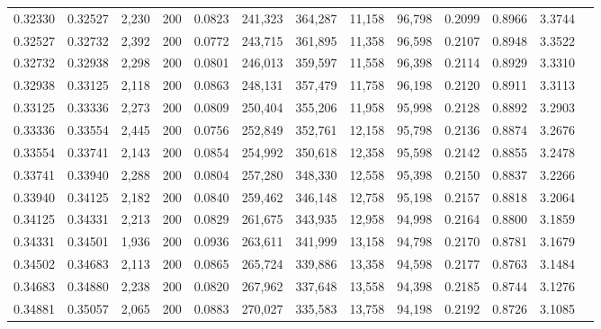 \begin{tabular}{rrrrrrrrrrrrr}
0.32330 & 0.32527 &  2,230 & 200 &                                     0.0823 & 241,323 & 364,287 &  11,158 &  96,798 & 0.2099 & 0.8966 & 3.3744 \\
0.32527 & 0.32732 &  2,392 & 200 &                                     0.0772 & 243,715 & 361,895 &  11,358 &  96,598 & 0.2107 & 0.8948 & 3.3522 \\
0.32732 & 0.32938 &  2,298 & 200 &                                     0.0801 & 246,013 & 359,597 &  11,558 &  96,398 & 0.2114 & 0.8929 & 3.3310 \\
0.32938 & 0.33125 &  2,118 & 200 &                                     0.0863 & 248,131 & 357,479 &  11,758 &  96,198 & 0.2120 & 0.8911 & 3.3113 \\
0.33125 & 0.33336 &  2,273 & 200 &                                     0.0809 & 250,404 & 355,206 &  11,958 &  95,998 & 0.2128 & 0.8892 & 3.2903 \\
0.33336 & 0.33554 &  2,445 & 200 &                                     0.0756 & 252,849 & 352,761 &  12,158 &  95,798 & 0.2136 & 0.8874 & 3.2676 \\
0.33554 & 0.33741 &  2,143 & 200 &                                     0.0854 & 254,992 & 350,618 &  12,358 &  95,598 & 0.2142 & 0.8855 & 3.2478 \\
0.33741 & 0.33940 &  2,288 & 200 &                                     0.0804 & 257,280 & 348,330 &  12,558 &  95,398 & 0.2150 & 0.8837 & 3.2266 \\
0.33940 & 0.34125 &  2,182 & 200 &                                     0.0840 & 259,462 & 346,148 &  12,758 &  95,198 & 0.2157 & 0.8818 & 3.2064 \\
0.34125 & 0.34331 &  2,213 & 200 &                                     0.0829 & 261,675 & 343,935 &  12,958 &  94,998 & 0.2164 & 0.8800 & 3.1859 \\
0.34331 & 0.34501 &  1,936 & 200 &                                     0.0936 & 263,611 & 341,999 &  13,158 &  94,798 & 0.2170 & 0.8781 & 3.1679 \\
0.34502 & 0.34683 &  2,113 & 200 &                                     0.0865 & 265,724 & 339,886 &  13,358 &  94,598 & 0.2177 & 0.8763 & 3.1484 \\
0.34683 & 0.34880 &  2,238 & 200 &                                     0.0820 & 267,962 & 337,648 &  13,558 &  94,398 & 0.2185 & 0.8744 & 3.1276 \\
0.34881 & 0.35057 &  2,065 & 200 &                                     0.0883 & 270,027 & 335,583 &  13,758 &  94,198 & 0.2192 & 0.8726 & 3.1085 \\

\end{tabular}
